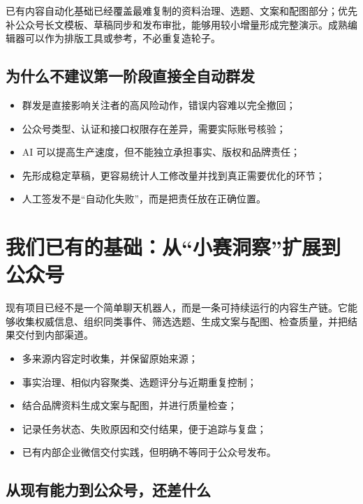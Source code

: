 \documentclass[UTF8,11pt,a4paper,fontset=none]{ctexart}
\begin{document}
\begin{decisionbox}[推荐：先走“半自动协同型”]
已有内容自动化基础已经覆盖最难复制的资料治理、选题、文案和配图部分；优先补公众号长文模板、草稿同步和发布审批，能够用较小增量形成完整演示。成熟编辑器可以作为排版工具或参考，不必重复造轮子。
\end{decisionbox}

\subsection{为什么不建议第一阶段直接全自动群发}

\begin{itemize}
  \item 群发是直接影响关注者的高风险动作，错误内容难以完全撤回；
  \item 公众号类型、认证和接口权限存在差异，需要实际账号核验；
  \item AI 可以提高生产速度，但不能独立承担事实、版权和品牌责任；
  \item 先形成稳定草稿，更容易统计人工修改量并找到真正需要优化的环节；
  \item 人工签发不是“自动化失败”，而是把责任放在正确位置。
\end{itemize}

\section{我们已有的基础：从“小赛洞察”扩展到公众号}

现有项目已经不是一个简单聊天机器人，而是一条可持续运行的内容生产链。它能够收集权威信息、组织同类事件、筛选选题、生成文案与配图、检查质量，并把结果交付到内部渠道。

\begin{factbox}[当前可复用能力]
\begin{itemize}
  \item 多来源内容定时收集，并保留原始来源；
  \item 事实治理、相似内容聚类、选题评分与近期重复控制；
  \item 结合品牌资料生成文案与配图，并进行质量检查；
  \item 记录任务状态、失败原因和交付结果，便于追踪与复盘；
  \item 已有内部企业微信交付实践，但明确不等同于公众号发布。
\end{itemize}
\end{factbox}

\subsection{从现有能力到公众号，还差什么}
\end{document}
